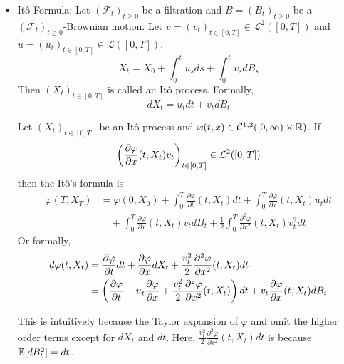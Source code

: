 \documentclass[a4paper,12pt]{article}
\begin{document}
\begin{itemize}
  \item It\^o Formula: Let $(\mathcal{F}_t)_{t\geqslant 0}$ be a filtration and $B= (B_t)_{t \geqslant 0}$ be a $(\mathcal{F}_t)_{t\geqslant 0}$-Brownian motion. Let $v = (v_t)_{t \in [0,T]} \in \mathcal{L}^2([0,T])$ and $u=(u_t)_{t \in [0,T]}\in \mathcal{L}([0,T])$.
  \begin{equation*}
    X_t = X_0 + \int_0^tu_sds + \int_0^tv_sdB_s
  \end{equation*}
  Then $(X_t)_{t \in [0,T]}$ is called an It\^o process. Formally,
  \begin{equation*}
    dX_t = u_tdt + v_tdB_t
  \end{equation*}

  \begin{thm}[It\^o's Formula]
    Let $(X_t)_{t \in [0,T]}$ be an It\^o process and $\varphi(t,x) \in \mathcal{C}^{1,2}([0,\infty)\times\mathbb{R})$. If
    \begin{equation*}
      \left(\frac{\partial \varphi}{\partial x}(t,X_t)v_t\right)_{t \in [0,T]} \in \mathcal{L}^2([0,T])
    \end{equation*}
    then the It\^o's formula is
    \begin{equation*}
      \begin{split}
        \varphi(T,X_T) &= \varphi(0,X_0) + \int_0^T\frac{\partial \varphi}{\partial t}(t, X_t)dt +  \int_0^T\frac{\partial \varphi}{\partial x}(t, X_t)u_tdt \\
        &\quad+ \int_0^T\frac{\partial \varphi}{\partial x}(t, X_t)v_tdB_t + \frac{1}{2}\int_0^T\frac{\partial^2 \varphi}{\partial x^2}(t, X_t)v^2_tdt
      \end{split}
    \end{equation*}
    Or formally,
    \begin{equation*}
      \begin{split}
        d\varphi(t,X_t) &= \frac{\partial \varphi}{\partial t}dt + \frac{\partial \varphi}{\partial x}dX_t + \frac{v^2_t}{2}\frac{\partial^2 \varphi}{\partial x^2}(t, X_t)dt  \\
        &= \left(\frac{\partial \varphi}{\partial t} + u_t\frac{\partial \varphi}{\partial x} + \frac{v^2_t}{2}\frac{\partial^2 \varphi}{\partial x^2}(t, X_t)\right)dt + v_t\frac{\partial \varphi}{\partial x}(t, X_t)dB_t
      \end{split}
    \end{equation*}
  \end{thm}
  \begin{rmk}
    This is intuitively because the Taylor expansion of $\varphi$ and omit the higher order terms except for $dX_t$ and $dt$. Here, $\frac{v^2_t}{2}\frac{\partial^2 \varphi}{\partial x^2}(t, X_t)dt$ is because $\mathbb{E}[dB_t^2] = dt$. 

\end{rmk}
\end{itemize}
\end{document}
